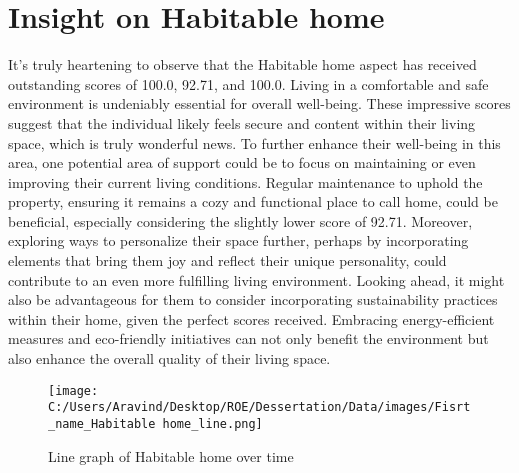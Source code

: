 \documentclass[10pt, a4paper]{article}%
\begin{document}
%
\section{Insight on Habitable home}%
\label{sec:InsightonHabitablehome}%
It's truly heartening to observe that the Habitable home aspect has received outstanding scores of 100.0, 92.71, and 100.0. Living in a comfortable and safe environment is undeniably essential for overall well{-}being. These impressive scores suggest that the individual likely feels secure and content within their living space, which is truly wonderful news.\newline%
\newline%
To further enhance their well{-}being in this area, one potential area of support could be to focus on maintaining or even improving their current living conditions. Regular maintenance to uphold the property, ensuring it remains a cozy and functional place to call home, could be beneficial, especially considering the slightly lower score of 92.71. Moreover, exploring ways to personalize their space further, perhaps by incorporating elements that bring them joy and reflect their unique personality, could contribute to an even more fulfilling living environment.\newline%
\newline%
Looking ahead, it might also be advantageous for them to consider incorporating sustainability practices within their home, given the perfect scores received. Embracing energy{-}efficient measures and eco{-}friendly initiatives can not only benefit the environment but also enhance the overall quality of their living space.%


\begin{figure}[H]%
\centering%
\texttt{[image: C:/Users/Aravind/Desktop/ROE/Dessertation/Data/images/Fisrt\_name\_Habitable home\_line.png]}%
\caption{Line graph of Habitable home over time}%
\end{figure}

%
\end{document}
